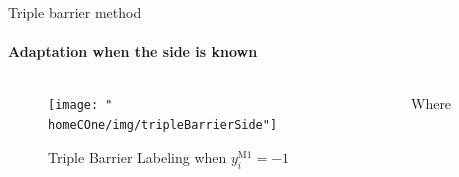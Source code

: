 \documentclass{beamer} %
\newcommand{\homeCOne}{../../Chapter 1 - Metalabeling/Draft}
\begin{document}
\begin{frame}{Triple barrier method}
\framesubtitle{Adaptation when the side is known}
\begin{columns}
\begin{column}{.6\textwidth}
\begin{figure}
	\centering
	\texttt{[image: "\\homeCOne/img/tripleBarrierSide"]}
	\caption{Triple Barrier Labeling when $y_i^{\text{M1}} = -1$}
\end{figure}
\end{column}
\begin{column}{.4\textwidth}
	\begin{center}
	\end{center}
	Where
	\begin{center}
	\end{center}
\end{column}
\end{columns}

\end{frame}
\end{document}
